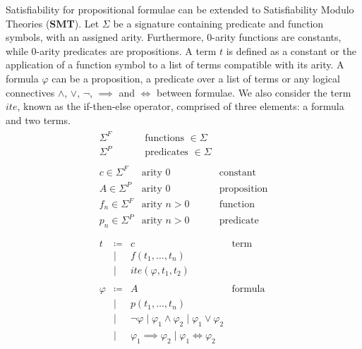 \documentclass[runningheads]{llncs}
\begin{document}
Satisfiability for propositional formulae can be extended to Satisfiability Modulo Theories (\textbf{SMT}).
Let $\Sigma$ be a signature containing predicate and function symbols, with an assigned arity.
Furthermore, 0-arity functions are constants, while 0-arity predicates are propositions.
A term $t$ is defined as a constant or the application of a function symbol to a list of terms compatible with its arity.
A formula $\varphi$ can be a proposition, a predicate over a list of terms or any logical connectives $\land$, $\lor$, $\neg$, $\implies$ and $\iff$ between formulae.
We also consider the term $ite$, known as the if-then-else operator, comprised of three elements: a formula and two terms.
\begin{equation}
    \label{eq:smt-notations}
    \begin{gathered}
        \begin{array}{lll}
            \Sigma^F         & \text{ functions } \in \Sigma                       \\
            \Sigma^P         & \text{ predicates } \in \Sigma                      \\
            \\
            c \in \Sigma^F   & \text{arity } 0                & \text{constant}    \\
            A \in \Sigma^P   & \text{arity } 0                & \text{proposition} \\
            f_n \in \Sigma^F & \text{arity } n > 0            & \text{function}    \\
            p_n \in \Sigma^P & \text{arity } n > 0            & \text{predicate}   \\
        \end{array}
        \\
        \begin{array}{lrll}
            t       & \coloneqq & c                                                                           & \text{term}    \\
                    & \mid      & f(t_1, \ldots, t_n)                                                                          \\
                    & \mid      & ite(\varphi, t_1, t_2)                                                                       \\
            \\
            \varphi & \coloneqq & A                                                                           & \text{formula} \\
                    & \mid      & p(t_1, \ldots, t_n)                                                                          \\
                    & \mid      & \neg\varphi    \mid \varphi_1 \land \varphi_2 \mid \varphi_1 \lor \varphi_2                  \\
                    & \mid      & \varphi_1 \implies \varphi_2 \mid \varphi_1 \iff \varphi_2                                   \\
        \end{array}
    \end{gathered}
\end{equation}
\end{document}
